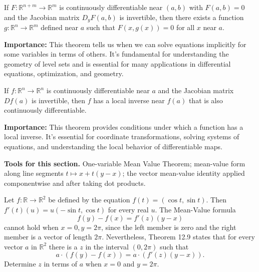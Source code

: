 \begin{theorem}
If $F: \mathbb{R}^{n+m} \to \mathbb{R}^m$ is continuously differentiable near $(a,b)$ with $F(a,b) = 0$ and the Jacobian matrix $D_y F(a,b)$ is invertible, then there exists a function $g: \mathbb{R}^n \to \mathbb{R}^m$ defined near $a$ such that $F(x,g(x)) = 0$ for all $x$ near $a$.
\end{theorem}

\noindent\textbf{Importance:} This theorem tells us when we can solve equations implicitly for some variables in terms of others. It's fundamental for understanding the geometry of level sets and is essential for many applications in differential equations, optimization, and geometry.



\begin{theorem}
If $f: \mathbb{R}^n \to \mathbb{R}^n$ is continuously differentiable near $a$ and the Jacobian matrix $Df(a)$ is invertible, then $f$ has a local inverse near $f(a)$ that is also continuously differentiable.
\end{theorem}

\noindent\textbf{Importance:} This theorem provides conditions under which a function has a local inverse. It's essential for coordinate transformations, solving systems of equations, and understanding the local behavior of differentiable maps.



\noindent\textbf{Tools for this section.} One-variable Mean Value Theorem; mean-value form along line segments $t\mapsto x+t(y-x)$; the vector mean-value identity applied componentwise and after taking dot products.



\begin{problembox}
\begin{problemstatement}
Let \( f: \mathbb{R} \rightarrow \mathbb{R}^2 \) be defined by the equation \( f(t) = (\cos t, \sin t) \). Then \( f'(t)(u) = u(-\sin t, \cos t) \) for every real \( u \). The Mean-Value formula
\[f(y) - f(x) = f'(z)(y - x)\]
cannot hold when \( x = 0, y = 2\pi \), since the left member is zero and the right member is a vector of length \( 2\pi \). Nevertheless, Theorem 12.9 states that for every vector \( a \) in \( \mathbb{R}^2 \) there is a \( z \) in the interval \( (0, 2\pi) \) such that
\[a \cdot (f(y) - f(x)) = a \cdot (f'(z)(y - x)).\]
Determine \( z \) in terms of \( a \) when \( x = 0 \) and \( y = 2\pi \).
\end{problemstatement}
\end{problembox}

